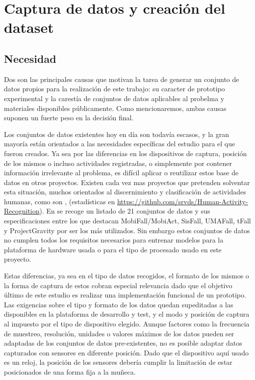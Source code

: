 \documentclass[../tfm.tex]{subfiles}
\begin{document}
\section{Captura de datos y creación del dataset}

\subsection{Necesidad}

Dos son las principales causas que motivan la tarea de generar un conjunto de datos propios para la realización de este trabajo: su caracter de prototipo experimental y la carestía de conjuntos de datos aplicables al probelma y materiales disponibles públicamente. Como mencionaremos, ambas causas suponen un fuerte peso en la decisión final.

Los conjuntos de datos existentes hoy en día son todavía escasos, y la gran mayoría están orientados a las necesidades específicas del estudio para el que fueron creados. Ya sea por las diferencias en los dispositivos de captura, posición de los mismos o incluso actividades registradas, o simplemente por contener información irrelevante al problema, es difícil aplicar o reutilizar estos base de datos en otros proyectos. Existen cada vez mas proyectos que pretenden solventar esta situación, muchos orientados al discernimiento y clasificación de actividades humanas, como son \cite{Anguita2013,ReyesOrtiz2014}, (estadísticas en \url{https://github.com/srvds/Human-Activity-Recognition}). En \cite{Casilari2020} se recoge un listado de 21 conjuntos de datos y sus especificaciones entre los que destacan MobiFall\cite{MobiFall}/MobiAct\cite{MobiAct}, SisFall\cite{Sucerquia2017}, UMAFall\cite{Edu/UMA/2017}, tFall\cite{tfall} y ProjectGravity\cite{Vilarinho2015} por ser los más utilizados. Sin embargo estos conjuntos de datos no cumplen todos los requisitos necesarios para entrenar modelos para la plataforma de hardware usada o para el tipo de procesado usado en este proyecto.

Estas diferencias, ya sea en el tipo de datos recogidos, el formato de los mismos o la forma de captura de estos cobran especial relevancia dado que el objetivo último de este estudio es realizar una implementación funcional de un prototipo. Las exigencias sobre el tipo y formato de los datos quedan supeditadas a las disponibles en la plataforma de desarrollo y test, y el modo y posición de captura al impuesto por el tipo de dispositivo elegido. Aunque factores como la frecuencia de muestreo, resolución, unidades o valores máximos de los datos pueden ser adaptadas de los conjuntos de datos pre-existentes, no es posible adaptar datos capturados con sensores en diferente posición. Dado que el dispositivo aquí usado es un reloj, la posición de los sensores debería cumplir la limitación de estar posicionados de una forma fija a la muñeca.
\end{document}
